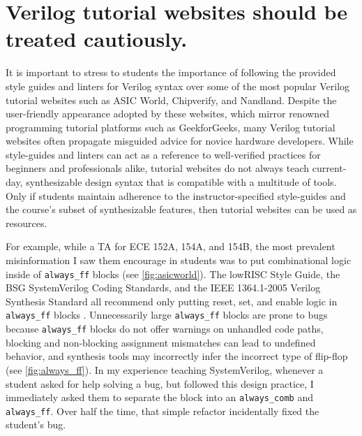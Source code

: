\section{Verilog tutorial websites should be treated cautiously.}
\label{section:tutorial_websites}

It is important to stress to students the importance of following the provided style guides and linters for Verilog syntax over some of the most popular Verilog tutorial websites such as ASIC World, Chipverify, and Nandland.
Despite the user-friendly appearance adopted by these websites, which mirror renowned programming tutorial platforms such as GeekforGeeks, many Verilog tutorial websites often propagate misguided advice for novice hardware developers.
While style-guides and linters can act as a reference to well-verified practices for beginners and professionals alike, tutorial websites do not always teach current-day, synthesizable design syntax that is compatible with a multitude of tools.
Only if students maintain adherence to the instructor-specified style-guides and the course's subset of synthesizable features, then tutorial websites can be used as resources.




For example, while a TA for ECE 152A, 154A, and 154B, the most prevalent misinformation I saw them encourage in students was to put combinational logic inside of \texttt{always_ff} blocks (see \autoref{fig:asicworld}).
The lowRISC Style Guide, the BSG SystemVerilog Coding Standards, and the IEEE 1364.1-2005 Verilog Synthesis Standard all recommend only putting reset, set, and enable logic in \texttt{always_ff} blocks \cite{lowRISCstyleguides, BSGstyleguide, 1364.1-2005}.
Unnecessarily large \texttt{always_ff} blocks are prone to bugs because \texttt{always_ff} blocks do not offer warnings on unhandled code paths, blocking and non-blocking assignment mismatches can lead to undefined behavior, and synthesis tools may incorrectly infer the incorrect type of flip-flop (see \autoref{fig:always_ff}).
In my experience teaching SystemVerilog, whenever a student asked for help solving a bug, but followed this design practice, I immediately asked them to separate the block into an \texttt{always_comb} and \texttt{always_ff}.
Over half the time, that simple refactor incidentally fixed the student's bug.

\FloatBarrier

